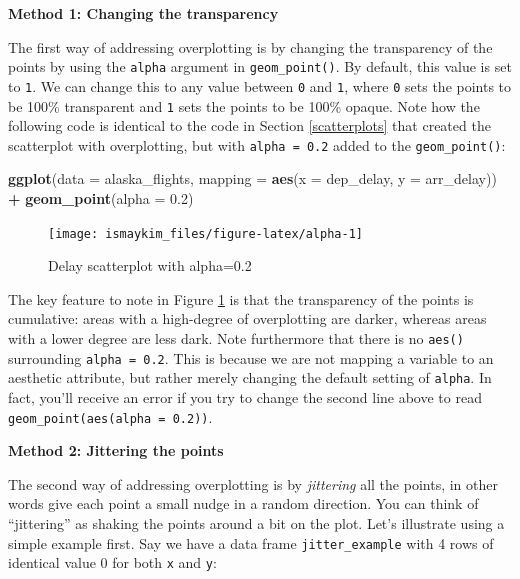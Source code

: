 \documentclass[12pt, krantz2,]{krantz}
\makeatletter
\newenvironment{Shaded}{\begin{snugshade}}{\end{snugshade}}
\newcommand{\DataTypeTok}[1]{\textcolor[rgb]{0.27,0.27,0.27}{#1}}
\newcommand{\FloatTok}[1]{\textcolor[rgb]{0.06,0.06,0.06}{#1}}
\newcommand{\KeywordTok}[1]{\textcolor[rgb]{0.27,0.27,0.27}{\textbf{#1}}}
\newcommand{\NormalTok}[1]{#1}
\newcommand{\OperatorTok}[1]{\textcolor[rgb]{0.43,0.43,0.43}{\textbf{#1}}}
\newcommand{\StringTok}[1]{\textcolor[rgb]{0.5,0.5,0.5}{#1}}
\newenvironment{kframe}{%
\medskip{}
\setlength{\fboxsep}{.8em}
 \def\at@end@of@kframe{}%
 \ifinner\ifhmode%
  \def\at@end@of@kframe{\end{minipage}}%
  \begin{minipage}{\columnwidth}%
 \fi\fi%
 \def\FrameCommand##1{\hskip\@totalleftmargin \hskip-\fboxsep
 \colorbox{shadecolor}{##1}\hskip-\fboxsep
     \hskip-\linewidth \hskip-\@totalleftmargin \hskip\columnwidth}%
 \MakeFramed {\advance\hsize-\width
   \@totalleftmargin\z@ \linewidth\hsize
   \@setminipage}}%
 {\par\unskip\endMakeFramed%
 \at@end@of@kframe}
\renewenvironment{Shaded}{\begin{kframe}}{\end{kframe}}
\makeatother
\begin{document}
\textbf{Method 1: Changing the transparency}

The first way of addressing overplotting is by changing the transparency of the points by using the \texttt{alpha} argument in \texttt{geom\_point()}. By default, this value is set to \texttt{1}. We can change this to any value between \texttt{0} and \texttt{1}, where \texttt{0} sets the points to be 100\% transparent and \texttt{1} sets the points to be 100\% opaque. Note how the following code is identical to the code in Section \ref{scatterplots} that created the scatterplot with overplotting, but with \texttt{alpha\ =\ 0.2} added to the \texttt{geom\_point()}:

\begin{Shaded}
\begin{Highlighting}[]
\KeywordTok{ggplot}\NormalTok{(}\DataTypeTok{data =}\NormalTok{ alaska_flights, }\DataTypeTok{mapping =} \KeywordTok{aes}\NormalTok{(}\DataTypeTok{x =}\NormalTok{ dep_delay, }\DataTypeTok{y =}\NormalTok{ arr_delay)) }\OperatorTok{+}\StringTok{ }
\StringTok{  }\KeywordTok{geom_point}\NormalTok{(}\DataTypeTok{alpha =} \FloatTok{0.2}\NormalTok{)}
\end{Highlighting}
\end{Shaded}

\begin{figure}

{\centering \texttt{[image: ismaykim\_files/figure-latex/alpha-1]} 

}

\caption{Delay scatterplot with alpha=0.2}\label{fig:alpha}
\end{figure}

The key feature to note in Figure \ref{fig:alpha} is that the transparency of the points is cumulative: areas with a high-degree of overplotting are darker, whereas areas with a lower degree are less dark. Note furthermore that there is no \texttt{aes()} surrounding \texttt{alpha\ =\ 0.2}. This is because we are not mapping a variable to an aesthetic attribute, but rather merely changing the default setting of \texttt{alpha}. In fact, you'll receive an error if you try to change the second line above to read \texttt{geom\_point(aes(alpha\ =\ 0.2))}.

\textbf{Method 2: Jittering the points}

The second way of addressing overplotting is by \emph{jittering} all the points, in other words give each point a small nudge in a random direction. You can think of ``jittering'' as shaking the points around a bit on the plot. Let's illustrate using a simple example first. Say we have a data frame \texttt{jitter\_example} with 4 rows of identical value 0 for both \texttt{x} and \texttt{y}:
\end{document}
